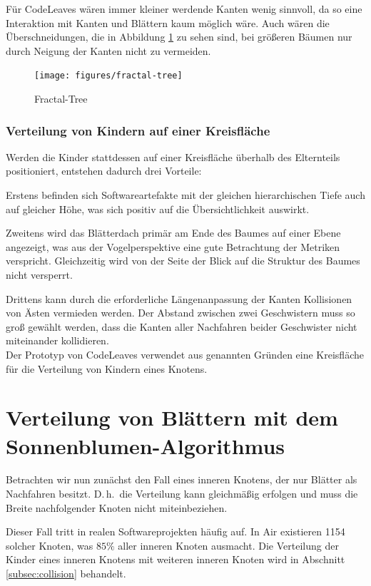 Für CodeLeaves wären immer kleiner werdende Kanten wenig sinnvoll, da so eine Interaktion mit Kanten und Blättern kaum möglich wäre. Auch wären die Überschneidungen, die in Abbildung \ref{fig:fractal-tree} zu sehen sind, bei größeren Bäumen nur durch Neigung der Kanten nicht zu vermeiden.

\begin{figure}[htb]
  \texttt{[image: figures/fractal-tree]}
  \caption{Fractal-Tree \cite{rocchini2017fractal}}
  \label{fig:fractal-tree}
\end{figure}

\subsubsection*{Verteilung von Kindern auf einer Kreisfläche}
Werden die Kinder stattdessen auf einer Kreisfläche überhalb des Elternteils positioniert, entstehen dadurch drei Vorteile:

Erstens befinden sich Softwareartefakte mit der gleichen hierarchischen Tiefe auch auf gleicher Höhe, was sich positiv auf die Übersichtlichkeit auswirkt.

Zweitens wird das Blätterdach primär am Ende des Baumes auf einer Ebene angezeigt, was aus der Vogelperspektive eine gute Betrachtung der Metriken verspricht. Gleichzeitig wird von der Seite der Blick auf die Struktur des Baumes nicht versperrt.

Drittens kann durch die erforderliche Längenanpassung der Kanten Kollisionen von Ästen vermieden werden. Der Abstand zwischen zwei Geschwistern muss so groß gewählt werden, dass die Kanten aller Nachfahren beider Geschwister nicht miteinander kollidieren.\\

Der Prototyp von CodeLeaves verwendet aus genannten Gründen eine Kreisfläche für die Verteilung von Kindern eines Knotens.

\section{Verteilung von Blättern mit dem Sonnenblumen-Algorithmus}
\label{sec:sunflower}

Betrachten wir nun zunächst den Fall eines inneren Knotens, der nur Blätter als Nachfahren besitzt. D.\,h.\ die Verteilung kann gleichmäßig erfolgen und muss die Breite nachfolgender Knoten nicht miteinbeziehen.

Dieser Fall tritt in realen Softwareprojekten häufig auf. In Air existieren 1154 solcher Knoten, was $85\%$ aller inneren Knoten ausmacht. Die Verteilung der Kinder eines inneren Knotens mit weiteren inneren Knoten wird in Abschnitt \ref{subsec:collision} behandelt.

